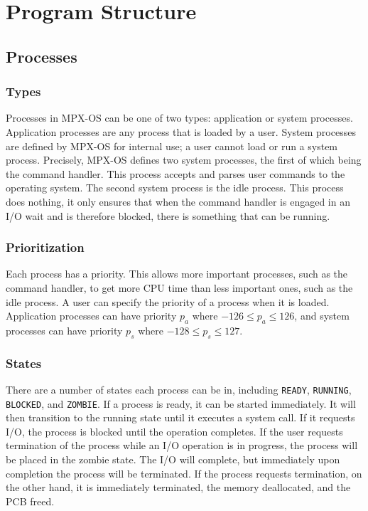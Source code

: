 \chapter{Program Structure}
\label{program_structure}

\section{Processes}

\subsection{Types}

Processes in MPX-OS can be one of two types: application or system processes. Application processes are any process that is loaded by a user. System processes are defined by MPX-OS for internal use; a user cannot load or run a system process. Precisely, MPX-OS defines two system processes, the first of which being the command handler. This process accepts and parses user commands to the operating system. The second system process is the idle process. This process does nothing, it only ensures that when the command handler is engaged in an I/O wait and is therefore blocked, there is something that can be running.

\subsection{Prioritization}

Each process has a priority. This allows more important processes, such as the command handler, to get more CPU time than less important ones, such as the idle process. A user can specify the priority of a process when it is loaded. Application processes can have priority $p_a$ where $-126 \le p_a \le 126$, and system processes can have priority $p_s$ where $-128 \le p_s \le 127$.

\subsection{States}

There are a number of states each process can be in, including {\tt READY}, {\tt RUNNING}, {\tt BLOCKED}, and {\tt ZOMBIE}. If a process is ready, it can be started immediately. It will then transition to the running state until it executes a system call. If it requests I/O, the process is blocked until the operation completes. If the user requests termination of the process while an I/O operation is in progress, the process will be placed in the zombie state. The I/O will complete, but immediately upon completion the process will be terminated. If the process requests termination, on the other hand, it is immediately terminated, the memory deallocated, and the PCB freed.

